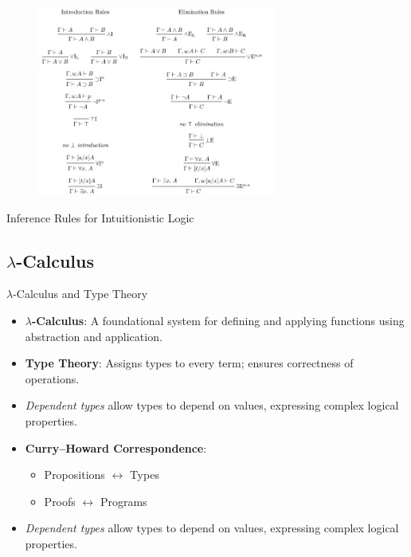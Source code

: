 \documentclass[aspectratio=169, 12pt]{beamer}
\begin{document}
\begin{frame}
    \begin{figure}[h]
  \centering
  \includegraphics[width=0.7\textwidth]{nid.jpeg}

\end{figure}
Inference Rules for Intuitionistic Logic
\end{frame}
\subsection*{$\lambda$-Calculus}
\begin{frame}{$\lambda$-Calculus and Type Theory}
\begin{itemize}
    \item \textbf{$\lambda$-Calculus}: A foundational system for defining and applying functions using abstraction and application.
    \item \textbf{Type Theory}: Assigns types to every term; ensures correctness of operations.
         \item \emph{Dependent types} allow types to depend on values, expressing complex logical properties.

    \item \textbf{Curry--Howard Correspondence}: 
    \begin{itemize}
        \item Propositions $\leftrightarrow$ Types
        \item Proofs $\leftrightarrow$ Programs
    \end{itemize}
    \item \emph{Dependent types} allow types to depend on values, expressing complex logical properties.
\end{itemize}
\end{frame}
\end{document}
